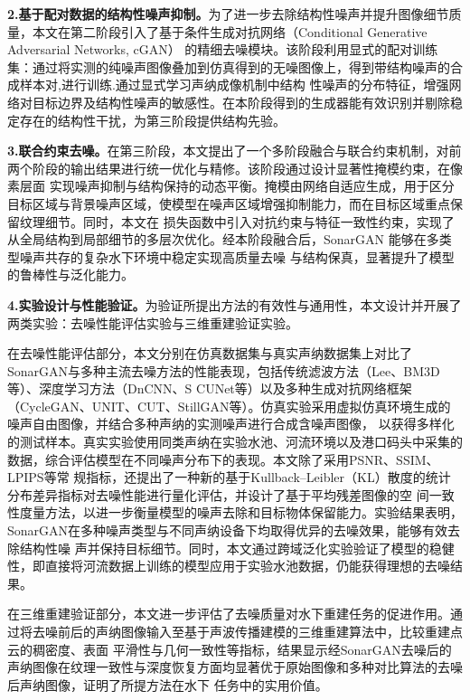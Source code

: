 \textbf{2.基于配对数据的结构性噪声抑制。}为了进一步去除结构性噪声并提升图像细节质量，本文在第二阶段引入了基于条件生成对抗网络（Conditional Generative Adversarial Networks, cGAN）
\cite{isola2017image}的精细去噪模块。该阶段利用显式的配对训练集：通过将实测的纯噪声图像叠加到仿真得到的无噪图像上，得到带结构噪声的合成样本对,进行训练.通过显式学习声纳成像机制中结构
性噪声的分布特征，增强网络对目标边界及结构性噪声的敏感性。在本阶段得到的生成器能有效识别并剔除稳定存在的结构性干扰，为第三阶段提供结构先验。

\textbf{3.联合约束去噪。}在第三阶段，本文提出了一个多阶段融合与联合约束机制，对前两个阶段的输出结果进行统一优化与精修。该阶段通过设计显著性掩模约束，在像素层面
实现噪声抑制与结构保持的动态平衡。掩模由网络自适应生成，用于区分目标区域与背景噪声区域，使模型在噪声区域增强抑制能力，而在目标区域重点保留纹理细节。同时，本文在
损失函数中引入对抗约束与特征一致性约束，实现了从全局结构到局部细节的多层次优化。经本阶段融合后，SonarGAN 能够在多类型噪声共存的复杂水下环境中稳定实现高质量去噪
与结构保真，显著提升了模型的鲁棒性与泛化能力。

\textbf{4.实验设计与性能验证。}为验证所提出方法的有效性与通用性，本文设计并开展了两类实验：去噪性能评估实验与三维重建验证实验。

在去噪性能评估部分，本文分别在仿真数据集与真实声纳数据集上对比了SonarGAN与多种主流去噪方法的性能表现，包括传统滤波方法（Lee、BM3D等）、深度学习方法（DnCNN、S
CUNet等）以及多种生成对抗网络框架（CycleGAN、UNIT、CUT、StillGAN等）。仿真实验采用虚拟仿真环境生成的噪声自由图像，并结合多种声纳的实测噪声进行合成含噪声图像，
以获得多样化的测试样本。真实实验使用同类声纳在实验水池、河流环境以及港口码头中采集的数据，综合评估模型在不同噪声分布下的表现。本文除了采用PSNR、SSIM、LPIPS等常
规指标，还提出了一种新的基于Kullback–Leibler（KL）散度\cite{kullback1951information}的统计分布差异指标对去噪性能进行量化评估，并设计了基于平均残差图像的空
间一致性度量方法，以进一步衡量模型的噪声去除和目标物体保留能力。实验结果表明，SonarGAN在多种噪声类型与不同声纳设备下均取得优异的去噪效果，能够有效去除结构性噪
声并保持目标细节。同时，本文通过跨域泛化实验验证了模型的稳健性，即直接将河流数据上训练的模型应用于实验水池数据，仍能获得理想的去噪结果。

在三维重建验证部分，本文进一步评估了去噪质量对水下重建任务的促进作用。通过将去噪前后的声纳图像输入至基于声波传播建模的三维重建算法中，比较重建点云的稠密度、表面
平滑性与几何一致性等指标，结果显示经SonarGAN去噪后的声纳图像在纹理一致性与深度恢复方面均显著优于原始图像和多种对比算法的去噪后声纳图像，证明了所提方法在水下
任务中的实用价值。


